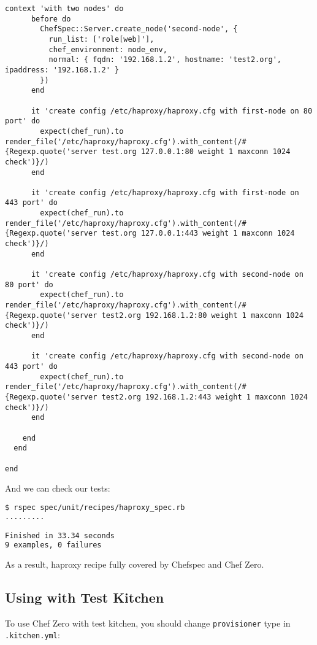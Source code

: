 \begin{lstlisting}[label=lst:testing-chef-zero15]
    context 'with two nodes' do
      before do
        ChefSpec::Server.create_node('second-node', {
          run_list: ['role[web]'],
          chef_environment: node_env,
          normal: { fqdn: '192.168.1.2', hostname: 'test2.org', ipaddress: '192.168.1.2' }
        })
      end

      it 'create config /etc/haproxy/haproxy.cfg with first-node on 80 port' do
        expect(chef_run).to render_file('/etc/haproxy/haproxy.cfg').with_content(/#{Regexp.quote('server test.org 127.0.0.1:80 weight 1 maxconn 1024 check')}/)
      end

      it 'create config /etc/haproxy/haproxy.cfg with first-node on 443 port' do
        expect(chef_run).to render_file('/etc/haproxy/haproxy.cfg').with_content(/#{Regexp.quote('server test.org 127.0.0.1:443 weight 1 maxconn 1024 check')}/)
      end

      it 'create config /etc/haproxy/haproxy.cfg with second-node on 80 port' do
        expect(chef_run).to render_file('/etc/haproxy/haproxy.cfg').with_content(/#{Regexp.quote('server test2.org 192.168.1.2:80 weight 1 maxconn 1024 check')}/)
      end

      it 'create config /etc/haproxy/haproxy.cfg with second-node on 443 port' do
        expect(chef_run).to render_file('/etc/haproxy/haproxy.cfg').with_content(/#{Regexp.quote('server test2.org 192.168.1.2:443 weight 1 maxconn 1024 check')}/)
      end

    end
  end

end
\end{lstlisting}

And we can check our tests:

\begin{lstlisting}[language=Bash,label=lst:testing-chef-zero16]
$ rspec spec/unit/recipes/haproxy_spec.rb
.........

Finished in 33.34 seconds
9 examples, 0 failures
\end{lstlisting}

As a result, haproxy recipe fully covered by Chefspec and Chef Zero.

\subsection{Using with Test Kitchen}

To use Chef Zero with test kitchen, you should change \lstinline!provisioner! type in \lstinline!.kitchen.yml!:

